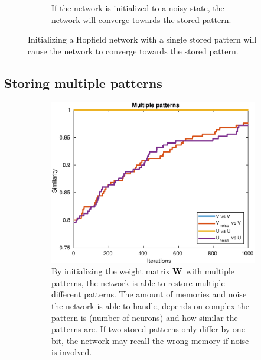 \begin{figure}[H]
\begin{subfigure}{0.49\textwidth}
        \caption{If the network is initialized to a noisy state, the network will converge towards the stored pattern. }
    \end{subfigure}
    \caption{Initializing a Hopfield network with a single stored pattern will cause the network to converge towards the stored pattern.}
\end{figure}

\subsection{Storing multiple patterns}
\begin{figure}[H]
    \centering
    \begin{subfigure}{0.49\textwidth}
        \includegraphics[width=\textwidth]{figs/multiple-patterns.eps}
        \caption{By initializing the weight matrix $\bf W$ with multiple patterns, the network is able to restore multiple different patterns. The amount of memories and noise the network is able to handle, depends on complex the pattern is (number of neurons) and how similar the patterns are. If two stored patterns only differ by one bit, the network may recall the wrong memory if noise is involved. }
    \end{subfigure}
    \begin{subfigure}{0.49\textwidth}

\end{subfigure}
\end{figure}
